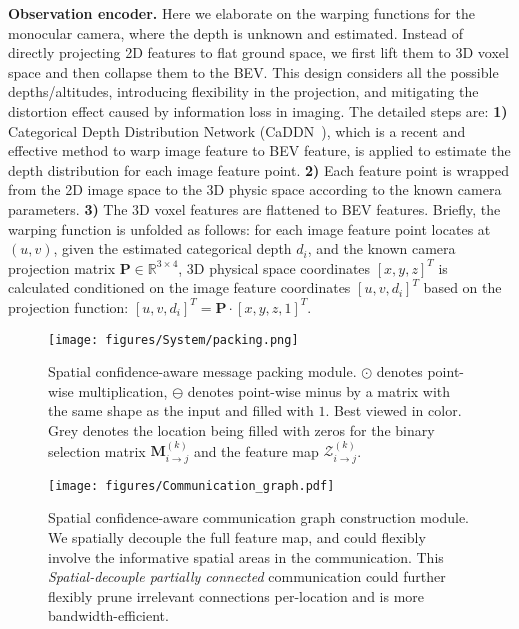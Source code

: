 \documentclass{article}
\begin{document}
\textbf{Observation encoder.} Here we elaborate on the warping functions for the monocular camera, where the depth is unknown and estimated. Instead of directly projecting 2D features to flat ground space, we first lift them to 3D voxel space and then collapse them to the BEV. This design considers all the possible depths/altitudes, introducing flexibility in the projection, and mitigating the distortion effect caused by information loss in imaging. The detailed steps are: {\bf 1)} Categorical Depth Distribution Network (CaDDN~\cite{CaDDN}), which is a recent and effective method to warp image feature to BEV feature, is applied to estimate the depth distribution for each image feature point. {\bf 2)} Each feature point is wrapped from the 2D image space to the 3D physic space according to the known camera parameters. {\bf 3)} The 3D voxel features are flattened to BEV features. Briefly, the warping function is unfolded as follows: for each image feature point locates at $(u,v)$, given the estimated categorical depth $d_i$, and the known camera projection matrix $\mathbf{P}\in\mathbb{R}^{3\times4}$, 3D physical space coordinates $[x,y,z]^T$ is calculated conditioned on the image feature coordinates $[u,v,d_i]^T$ based on the projection function:  $[u,v,d_i]^T=\mathbf{P}\cdot[x,y,z,1]^T$.


\begin{figure}
    \centering
\texttt{[image: figures/System/packing.png]}
    \caption{Spatial confidence-aware message packing module. $\odot$ denotes point-wise multiplication, $\ominus$ denotes point-wise minus by a matrix with the same shape as the input and filled with $1$. Best viewed in color. Grey denotes the location being filled with zeros for the binary selection matrix $\mathbf{M}_{i\rightarrow j}^{(k)}$ and the feature map $\mathcal{Z}_{i\rightarrow j}^{(k)}$.}
    \label{fig:packing}
\end{figure}


\begin{figure}
    \centering
\texttt{[image: figures/Communication\_graph.pdf]}
    \caption{Spatial confidence-aware communication graph construction module. We spatially decouple the full feature map, and could flexibly involve the informative spatial areas in the communication. This \textit{Spatial-decouple partially connected} communication could further flexibly prune irrelevant connections per-location and is more bandwidth-efficient.}
    \label{fig:communication_graph}
\end{figure}
\end{document}
